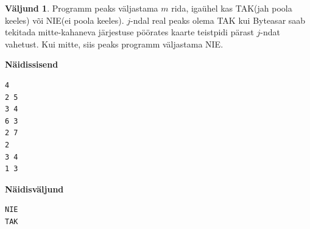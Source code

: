 \documentclass{trkut}
\theoremstyle{definition}
\newtheorem*{Output}{Väljund}
\begin{document}
\begin{Output}
Programm peaks väljastama $m$ rida, igaühel kas TAK(jah poola keeles) või NIE(ei poola keeles). 
$j$-ndal real peaks olema TAK kui Byteasar saab tekitada mitte-kahaneva järjestuse pöörates kaarte teistpidi pärast $j$-ndat vahetust. Kui mitte, siis peaks programm väljastama NIE.
\end{Output}



\textbf{Näidissisend}

\begin{verbatim}
4
2 5
3 4
6 3
2 7
2
3 4
1 3
\end{verbatim}

\textbf{Näidisväljund}

\begin{verbatim}
NIE
TAK
\end{verbatim}
\end{document}
